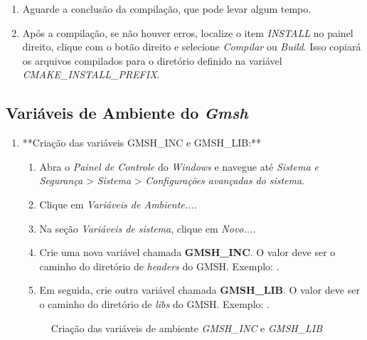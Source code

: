 \documentclass[a4paper,11pt]{article}
\newcommand{\gmsh}{\textit{Gmsh}}
\newcommand{\windows}{\textit{Windows}}
\begin{document}
\begin{enumerate}
\begin{enumerate}
		\item Aguarde a conclusão da compilação, que pode levar algum tempo.
		\item Após a compilação, se não houver erros, localize o item \emph{INSTALL} no painel direito, clique com o botão direito e selecione \emph{Compilar} ou \emph{Build}. Isso copiará os arquivos compilados para o diretório definido na variável \emph{CMAKE\_INSTALL\_PREFIX}.
	\end{enumerate}
\end{enumerate}
\subsection*{Variáveis de Ambiente do \gmsh{}}

\begin{enumerate}
	\item **Criação das variáveis GMSH\_INC e GMSH\_LIB:**
	\begin{enumerate}
		\item Abra o \textit{Painel de Controle} do \windows{} e navegue até \textit{Sistema e Segurança} > \textit{Sistema} > \textit{Configurações avançadas do sistema}.
		\item Clique em \textit{Variáveis de Ambiente...}.
		\item Na seção \textit{Variáveis de sistema}, clique em \textit{Novo...}.
		\item Crie uma nova variável chamada \textbf{GMSH\_INC}. O valor deve ser o caminho do diretório de \emph{headers} do GMSH. Exemplo: \path{C:\Program Files\gmsh}.
		\item Em seguida, crie outra variável chamada \textbf{GMSH\_LIB}. O valor deve ser o caminho do diretório de \emph{libs} do GMSH. Exemplo: \path{C:\Program Files\gmsh\lib}.
	\end{enumerate}
	
	\begin{figure}[H]\centering
		\caption{Criação das variáveis de ambiente \emph{GMSH\_INC} e \emph{GMSH\_LIB}}\label{fig:gmshdirsenv}
	\end{figure}
	

\end{enumerate}
\end{document}
